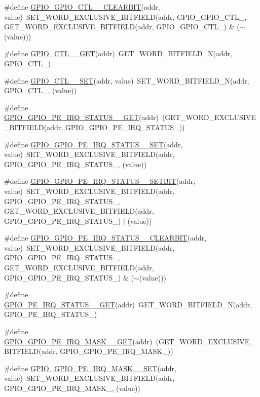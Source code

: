 \begin{DoxyCompactItemize}
\item 
\#define \hyperlink{a00554_a97479ca286945ca0751a847c0019c2b6}{GPIO\_\-GPIO\_\-CTL\_\_\-CLEARBIT}(addr, value)~SET\_\-WORD\_\-EXCLUSIVE\_\-BITFIELD(addr, GPIO\_\-GPIO\_\-CTL\_, GET\_\-WORD\_\-EXCLUSIVE\_\-BITFIELD(addr, GPIO\_\-GPIO\_\-CTL\_) \& ($\sim$(value)))
\item 
\#define \hyperlink{a00554_aa39e941392a0c180ce2dd2dc5ecb1788}{GPIO\_\-CTL\_\_\-GET}(addr)~GET\_\-WORD\_\-BITFIELD\_\-N(addr, GPIO\_\-CTL\_)
\item 
\#define \hyperlink{a00554_a4b2a3b92af9c759067c2bf1b6a718a9c}{GPIO\_\-CTL\_\_\-SET}(addr, value)~SET\_\-WORD\_\-BITFIELD\_\-N(addr, GPIO\_\-CTL\_, (value))
\item 
\#define \hyperlink{a00554_aa429d693288b0facac3ba7d38cb7e36f}{GPIO\_\-GPIO\_\-PE\_\-IRQ\_\-STATUS\_\_\-GET}(addr)~(GET\_\-WORD\_\-EXCLUSIVE\_\-BITFIELD(addr, GPIO\_\-GPIO\_\-PE\_\-IRQ\_\-STATUS\_))
\item 
\#define \hyperlink{a00554_a438c1c55038c22e9c02e5d63867c4007}{GPIO\_\-GPIO\_\-PE\_\-IRQ\_\-STATUS\_\_\-SET}(addr, value)~SET\_\-WORD\_\-EXCLUSIVE\_\-BITFIELD(addr, GPIO\_\-GPIO\_\-PE\_\-IRQ\_\-STATUS\_, (value))
\item 
\#define \hyperlink{a00554_adebe22e510f7d0473f424746dfe40dd0}{GPIO\_\-GPIO\_\-PE\_\-IRQ\_\-STATUS\_\_\-SETBIT}(addr, value)~SET\_\-WORD\_\-EXCLUSIVE\_\-BITFIELD(addr, GPIO\_\-GPIO\_\-PE\_\-IRQ\_\-STATUS\_, GET\_\-WORD\_\-EXCLUSIVE\_\-BITFIELD(addr, GPIO\_\-GPIO\_\-PE\_\-IRQ\_\-STATUS\_) $|$ (value))
\item 
\#define \hyperlink{a00554_afc04800a00e3d34ce27737290326d851}{GPIO\_\-GPIO\_\-PE\_\-IRQ\_\-STATUS\_\_\-CLEARBIT}(addr, value)~SET\_\-WORD\_\-EXCLUSIVE\_\-BITFIELD(addr, GPIO\_\-GPIO\_\-PE\_\-IRQ\_\-STATUS\_, GET\_\-WORD\_\-EXCLUSIVE\_\-BITFIELD(addr, GPIO\_\-GPIO\_\-PE\_\-IRQ\_\-STATUS\_) \& ($\sim$(value)))
\item 
\#define \hyperlink{a00554_a6ef5db50370f943cee8f4aef29e40b4b}{GPIO\_\-PE\_\-IRQ\_\-STATUS\_\_\-GET}(addr)~GET\_\-WORD\_\-BITFIELD\_\-N(addr, GPIO\_\-PE\_\-IRQ\_\-STATUS\_)
\item 
\#define \hyperlink{a00554_a6229f37913fe5c8bc084337226bc2a26}{GPIO\_\-GPIO\_\-PE\_\-IRQ\_\-MASK\_\_\-GET}(addr)~(GET\_\-WORD\_\-EXCLUSIVE\_\-BITFIELD(addr, GPIO\_\-GPIO\_\-PE\_\-IRQ\_\-MASK\_))
\item 
\#define \hyperlink{a00554_af1c983e6f3f0fb5a51651b4bddf91670}{GPIO\_\-GPIO\_\-PE\_\-IRQ\_\-MASK\_\_\-SET}(addr, value)~SET\_\-WORD\_\-EXCLUSIVE\_\-BITFIELD(addr, GPIO\_\-GPIO\_\-PE\_\-IRQ\_\-MASK\_, (value))

\end{DoxyCompactItemize}
